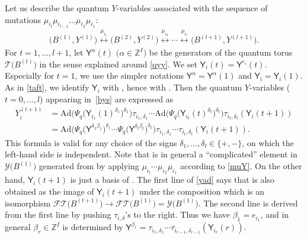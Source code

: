 \documentclass[11pt]{article}
\numberwithin{equation}{section}
\newcommand{\Z}{{\mathbb Z}}
\newcommand\rY{{\mathsf{Y}}}
\newcommand\Ad{{\mathrm{Ad}}}
\newcommand\bY{Y}
\numberwithin{equation}{section}
\begin{document}
Let us describe the quantum $Y$-variables associated with the sequence
of mutations $\mu_{i_l} \mu_{i_{l-1}} \dots \allowbreak\mu_{i_2} \mu_{i_1}$:
 \begin{align}\label{bys}
\bigl(B^{(1)},\bY^{(1)}\bigr) \stackrel{\mu_{i_1}}{\longleftrightarrow}
\bigl(B^{(2)},\bY^{(2)}\bigr) \stackrel{\mu_{i_2}}{\longleftrightarrow}
\cdots
\stackrel{\mu_{i_l}}{\longleftrightarrow} \bigl(B^{(l+1)},\bY^{(l+1)}\bigr).
\end{align}
%
For $t=1, \dots, l+1$, let $\rY^\alpha(t)$ $\bigl(\alpha \in \Z^I\bigr)$ be the
generators of the quantum torus $\mathcal{T}\bigl(B^{(t)}\bigr)$ in the sense
explained around \eqref{qyy}. We set $\rY_i(t) =
\rY^{e_i}(t)$.
Especially for $t=1$, we use the simpler notations
$\rY^\alpha=\rY^\alpha(1)$ and $\rY_i=\rY_i(1)$. As in \eqref{taft},
we identify $\rY_i$ with , hence
 with .
%
Then the quantum $Y$-variables 
($t=0, \dots, l$) appearing in~\eqref{bys} are expressed as
\begin{align}
Y_i^{(t+1)}
&= \Ad\bigl(\Psi_{q}\bigl(\rY_{i_1}(1)^{\delta_1}\bigr)^{\delta_1}\bigr) \tau_{i_1,\delta_1}\dotsm \Ad\bigl(\Psi_{q}\bigl(\rY_{i_{t}}(t)^{\delta_{t}}\bigr)^{\delta_{t}}\bigr) \tau_{i_{t},\delta_{t}}(\rY_i(t+1))\nonumber
\\
&=\Ad\bigl(\Psi_{q}\bigl(\rY^{\delta_1 \beta_1}\bigr)^{\delta_1} \dotsm \Psi_{q}\bigl(\rY^{\delta_{t} \beta_{t}}\bigr)^{\delta_{t}}\bigr) \tau_{i_1,\delta_1}\dotsm \tau_{i_{t},\delta_{t}}(\rY_i(t+1)).\label{yad}
\end{align}
This formula is valid for any choice of the signs $\delta_1, \dots,
\delta_l \in \{+, -\}$, on which the left-hand side is independent. Note that
 is in general a ``complicated'' element in
$\mathcal{Y}\bigl(B^{(1)}\bigr)$ generated from  by applying
$\mu_{i_t}\dotsm \mu_{i_2}\mu_{i_1}$ according to \eqref{muY}.
On the other hand,
$\rY_i(t+1)$ is just a basis of . The first
line of \eqref{yad} says that  is also obtained as the
image of $\rY_i(t+1)$ under the composition
 which is an
isomorphism
$\mathcal{FT}\bigl(B^{(t+1)}\bigr) \rightarrow \mathcal{FT}\bigl(B^{(1)}\bigr) =
\mathcal{Y}\bigl(B^{(1)}\bigr)$. The second line is derived from the first line
by pushing $\tau_{i,\delta}$'s to the right. Thus we have $\beta_1 = e_{i_1}$,
and in general $\beta_r \in \Z^I$ is determined by
$\rY^{\beta_r} = \tau_{i_1,\delta_1} \dotsm \tau_{i_{r-1},
 \delta_{r-1}}(\rY_{i_r}(r))$.
\end{document}
